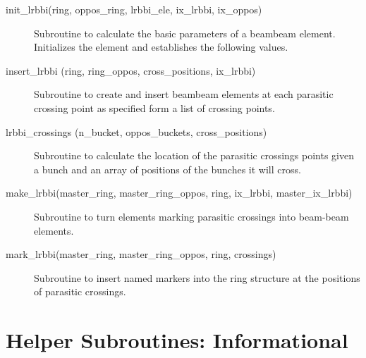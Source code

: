 \begin{description}

\item[init\_lrbbi(ring, oppos\_ring, lrbbi\_ele, ix\_lrbbi, ix\_oppos)] \Newline 
     Subroutine to calculate the basic parameters of a beambeam element. 
     Initializes the element and establishes the following values.

\item[insert\_lrbbi (ring, ring\_oppos, cross\_positions, ix\_lrbbi)] \Newline
Subroutine to create and insert beambeam elements at each parasitic crossing
point as specified form a list of crossing points.

\item[lrbbi\_crossings (n\_bucket, oppos\_buckets, cross\_positions)] \Newline
Subroutine to calculate the location of the parasitic crossings points 
given a bunch and an array of positions of the bunches it will cross. 

\item[make\_lrbbi(master\_ring, master\_ring\_oppos, ring, ix\_lrbbi, master\_ix\_lrbbi)] \Newline
Subroutine to turn elements marking parasitic crossings into beam-beam elements. 

\item[mark\_lrbbi(master\_ring, master\_ring\_oppos, ring, crossings)] \Newline
Subroutine to insert named markers into the ring structure at the positions of parasitic crossings. 

\end{description}

\section{Helper Subroutines: Informational}
\label{r:info}     

